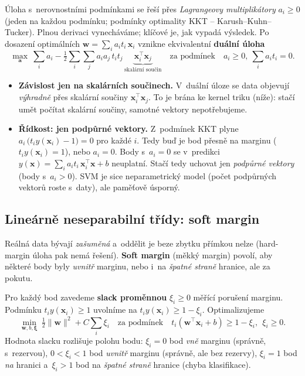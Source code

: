 Úloha s~nerovnostními podmínkami se řeší přes \emph{Lagrangeovy multiplikátory} $a_i\ge 0$ (jeden na každou podmínku; podmínky optimality KKT -- Karush--Kuhn--Tucker). Plnou derivaci vynecháváme; klíčové je, jak vypadá výsledek. Po dosazení optimálních $\mathbf{w}=\sum_i a_i t_i\,\mathbf{x}_i$ vznikne ekvivalentní \textbf{duální úloha}
\[ \max_{\mathbf{a}}\ \sum_i a_i - \tfrac12\sum_i\sum_j a_i a_j\,t_i t_j\,\underbrace{\mathbf{x}_i^{\!\top}\mathbf{x}_j}_{\text{skalární součin}}\quad\text{za podmínek}\quad a_i\ge 0,\ \sum_i a_i t_i = 0. \]

\begin{intuice}
\begin{itemize}
  \item \textbf{Závislost jen na skalárních součinech.} V~duální úloze se data objevují \emph{výhradně} přes skalární součiny $\mathbf{x}_i^{\!\top}\mathbf{x}_j$. To je brána ke kernel triku (níže): stačí umět počítat skalární součiny, samotné vektory nepotřebujeme.
  \item \textbf{Řídkost: jen podpůrné vektory.} Z~podmínek KKT plyne $a_i\,\big(t_i y(\mathbf{x}_i)-1\big)=0$ pro každé $i$. Tedy buď je bod přesně na marginu ($t_i y(\mathbf{x}_i)=1$), nebo $a_i=0$. Body s~$a_i=0$ se v~predikci $y(\mathbf{x})=\sum_i a_i t_i\,\mathbf{x}_i^{\!\top}\mathbf{x}+b$ neuplatní. Stačí tedy uchovat jen \emph{podpůrné vektory} (body s~$a_i>0$). SVM je sice neparametrický model (počet podpůrných vektorů roste s~daty), ale paměťově úsporný.
\end{itemize}
\end{intuice}

\subsection{Lineárně neseparabilní třídy: soft margin}

Reálná data bývají \emph{zašuměná} a~oddělit je beze zbytku přímkou nelze (hard-margin úloha pak nemá řešení). \textbf{Soft margin} (měkký margin) povolí, aby některé body byly \emph{uvnitř} marginu, nebo i~na \emph{špatné straně} hranice, ale za pokutu.

\begin{definice}
Pro každý bod zavedeme \textbf{slack proměnnou} $\xi_i\ge 0$ měřící porušení marginu. Podmínku $t_i y(\mathbf{x}_i)\ge 1$ uvolníme na $t_i y(\mathbf{x}_i)\ge 1-\xi_i$. Optimalizujeme
\[ \boxed{\ \min_{\mathbf{w},b,\boldsymbol{\xi}}\ \tfrac12\|\mathbf{w}\|^2 + C\sum_i \xi_i \quad\text{za podmínek}\quad t_i(\mathbf{w}^{\!\top}\mathbf{x}_i+b)\ge 1-\xi_i,\ \ \xi_i\ge 0.\ } \]
Hodnota slacku rozlišuje polohu bodu: $\xi_i=0$ bod \emph{vně} marginu (správně, s~rezervou), $0<\xi_i<1$ bod \emph{uvnitř} marginu (správně, ale bez rezervy), $\xi_i=1$ bod \emph{na} hranici a~$\xi_i>1$ bod na \emph{špatné straně} hranice (chyba klasifikace).
\end{definice}

